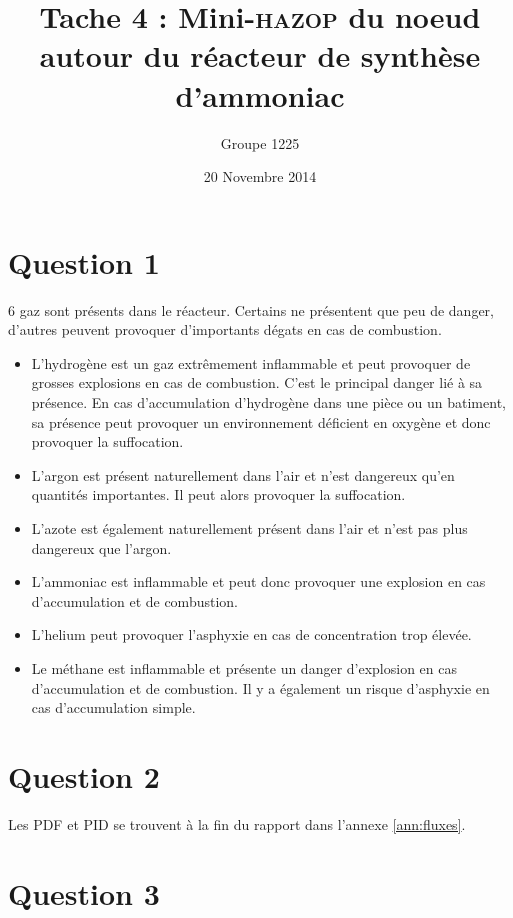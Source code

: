 \documentclass[a4paper,oneside,12pt]{article}
\title{Tache 4 : Mini-\textsc{hazop} du noeud autour du réacteur de synthèse d'ammoniac}
\author{Groupe 1225}
\date{20 Novembre 2014}
\begin{document}
\maketitle

\section*{Question 1}

6 gaz sont présents dans le réacteur. Certains ne présentent que peu de danger, d'autres peuvent provoquer d'importants dégats en cas de combustion.
\begin{itemize}	
	\item L'hydrogène est un gaz extrêmement inflammable et peut provoquer de grosses 
		explosions en cas de combustion. C'est le principal danger lié à sa présence. 
		En cas d'accumulation d'hydrogène dans une pièce ou un batiment, 
		sa présence peut provoquer un environnement déficient en oxygène et 
		donc provoquer la suffocation.

	\item  L'argon est présent naturellement dans l'air et n'est dangereux qu'en 
		quantités importantes. Il peut alors provoquer la suffocation.

	\item  L'azote est également naturellement présent dans l'air et n'est pas plus 
		dangereux que l'argon.

	\item  L'ammoniac est inflammable et peut donc provoquer une explosion en cas 
		d'accumulation et de combustion.

	\item  L'helium peut provoquer l'asphyxie en cas de concentration trop élevée.

	\item  Le méthane est inflammable et présente un danger d'explosion en cas 
		d'accumulation et de combustion. Il y a également un risque d'asphyxie en 
		cas d'accumulation simple.
\end{itemize}

\section*{Question 2}

Les PDF et PID se trouvent à la fin du rapport dans l'annexe \ref{ann:fluxes}.


\section*{Question 3}
\end{document}
